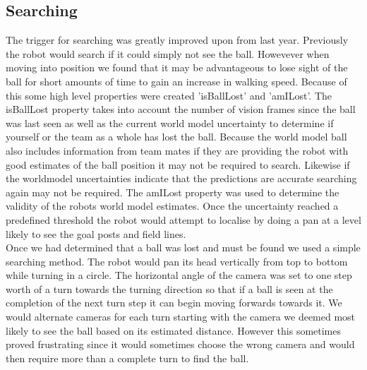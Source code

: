 \subsection{Searching}
The trigger for searching was greatly improved upon from last year. Previously the robot would search if it could simply not see the ball. Howevever when moving into position we found that it may be advantageous to lose sight of the ball for short amounts of time to gain an increase in walking speed. Because of this some high level properties were created 'isBallLost' and 'amILost'. The isBallLost property takes into account the number of vision frames since the ball was last seen as well as the current world model uncertainty to determine if yourself or the team as a whole has lost the ball. Because the world model ball also includes information from team mates if they are providing the robot with good estimates of the ball position it may not be required to search. Likewise if the worldmodel uncertainties indicate that the predictions are accurate searching again may not be required. The amILost property was used to determine the validity of the robots world model estimates. Once the uncertainty reached a predefined threshold the robot would attempt to localise by doing a pan at a level likely to see the goal posts and field lines.\\

Once we had determined that a ball was lost and must be found we used a simple searching method. The robot would pan its head vertically from top to bottom while turning in a circle. The horizontal angle of the camera was set to one step worth of a turn towards the turning direction so that if a ball is seen at the completion of the next turn step it can begin moving forwards towards it. We would alternate cameras for each turn starting with the camera we deemed most likely to see the ball based on its estimated distance. However this sometimes proved frustrating since it would sometimes choose the wrong camera and would then require more than a complete turn to find the ball.\\

